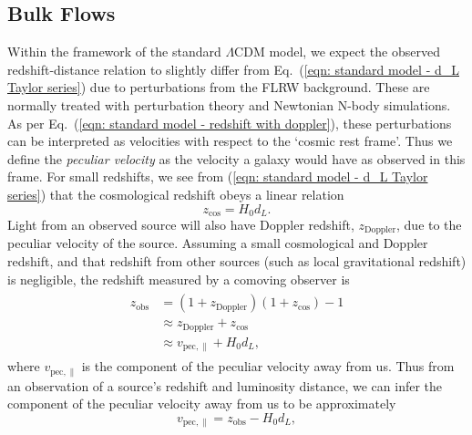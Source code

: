 \documentclass[a4paper,12pt]{report}
\renewcommand{\eqref}[1]{Eq.~({#1})}
\begin{document}
\subsection{Bulk Flows}\label{section: bulk flows}
Within the framework of the standard $\Lambda$CDM model, we expect the observed redshift-distance relation to slightly differ from \eqref{\ref{eqn: standard model - d_L Taylor series}} due to perturbations from the FLRW background. These are normally treated with perturbation theory and Newtonian N-body simulations. As per \eqref{\ref{eqn: standard model - redshift with doppler}}, these perturbations can be interpreted as velocities with respect to the `cosmic rest frame'. Thus we define the \textit{peculiar velocity} as the velocity a galaxy would have as observed in this frame.
For small redshifts, we see from (\ref{eqn: standard model - d_L Taylor series}) that the cosmological redshift obeys a linear relation
\begin{equation}
  z_\text{cos} = H_0 d_L.
\end{equation}
Light from an observed source will also have Doppler redshift, $z_\text{Doppler}$, due to the peculiar velocity of the source. Assuming a small cosmological and Doppler redshift, and that redshift from other sources (such as local gravitational redshift) is negligible, the redshift measured by a comoving observer is
\begin{align}
    \begin{split}\label{eqn: obs redshift linear breakdown}
        z_\text{obs} &= (1+z_\text{Doppler})(1+z_\text{cos}) - 1 \\
        &\approx z_\text{Doppler} + z_\text{cos} \\
        &\approx v_{\text{pec}, \parallel} + H_0 d_L,
    \end{split}
\end{align}
where $v_{\text{pec}, \parallel}$ is the component of the peculiar velocity away from us. Thus from an observation of a source's redshift and luminosity distance, we can infer the component of the peculiar velocity away from us to be approximately
\begin{equation} \label{eqn: peculiar velocity from linear distance-redshift}
  v_{\text{pec}, \parallel} = z_\text{obs} - H_0 d_L,
\end{equation}
\end{document}
